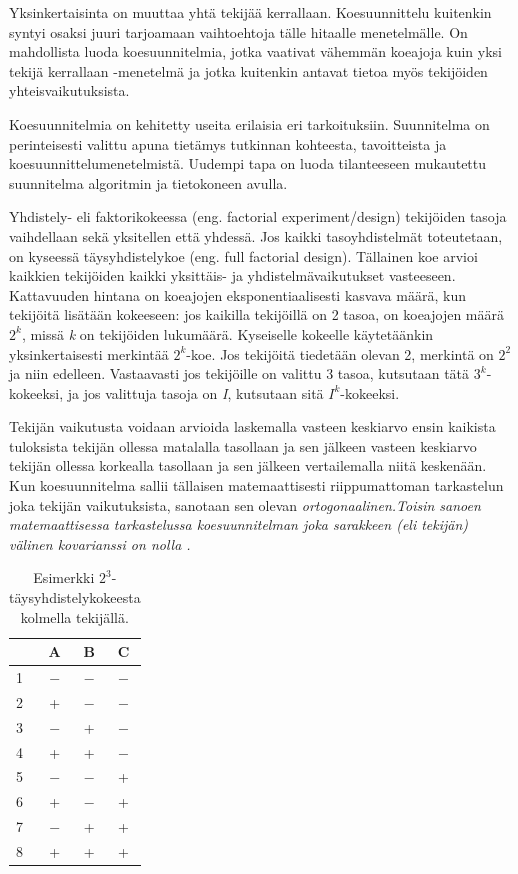 \documentclass[12pt,a4paper,finnish]{tutthesis}
\begin{document}
Yksinkertaisinta on muuttaa yhtä tekijää kerrallaan. Koesuunnittelu kuitenkin syntyi
osaksi juuri tarjoamaan vaihtoehtoja tälle hitaalle menetelmälle. On mahdollista luoda
koesuunnitelmia, jotka vaativat vähemmän koeajoja kuin yksi tekijä kerrallaan -menetelmä
ja jotka kuitenkin antavat tietoa myös tekijöiden yhteisvaikutuksista.

Koesuunnitelmia on kehitetty useita erilaisia eri tarkoituksiin.
Suunnitelma on perinteisesti valittu apuna tietämys
tutkinnan kohteesta, tavoitteista ja koesuunnittelumenetelmistä.
Uudempi tapa on luoda tilanteeseen
mukautettu suunnitelma algoritmin ja tietokoneen avulla.

Yhdistely- eli faktorikokeessa (eng. factorial experiment/design) tekijöiden
tasoja vaihdellaan sekä yksitellen että yhdessä. Jos kaikki tasoyhdistelmät
toteutetaan, on kyseessä täysyhdistelykoe (eng.
full factorial design). Tällainen koe arvioi kaikkien tekijöiden kaikki yksittäis-
ja yhdistelmävaikutukset vasteeseen. Kattavuuden hintana on koeajojen
eksponentiaalisesti kasvava määrä, kun tekijöitä lisätään kokeeseen: jos kaikilla
tekijöillä on 2 tasoa, on koeajojen määrä \(2^k\),
missä \textit{k} on
tekijöiden lukumäärä. Kyseiselle kokeelle käytetäänkin yksinkertaisesti
merkintää \(2^k\)-koe.
Jos tekijöitä tiedetään olevan 2, merkintä on
\(2^2\) ja niin edelleen. Vastaavasti jos tekijöille on valittu 3 tasoa,
kutsutaan tätä \(3^k\)-kokeeksi, ja jos valittuja tasoja on \textit{I},
kutsutaan sitä \(I^k\)-kokeeksi.

Tekijän vaikutusta voidaan arvioida laskemalla vasteen keskiarvo
ensin kaikista tuloksista tekijän ollessa matalalla tasollaan ja sen jälkeen
vasteen keskiarvo tekijän ollessa korkealla tasollaan ja sen jälkeen
vertailemalla niitä keskenään. Kun koesuunnitelma sallii tällaisen matemaattisesti
riippumattoman tarkastelun joka tekijän vaikutuksista, sanotaan
sen olevan \em ortogonaalinen.\em Toisin sanoen matemaattisessa
tarkastelussa koesuunnitelman joka sarakkeen (eli tekijän) välinen kovarianssi
on nolla \parencite{barker2005}.



\begin{table}[h]
  \begin{center}
  \caption{Esimerkki $2^3$-täysyhdistelykokeesta kolmella tekijällä.}
  \label{tab:fullf}
  \begin{tabular}{ | l | c | c | c | }
    \hline
     & \textbf{A} & \textbf{B} & \textbf{C} \\ \hline
    1 & $-$ & $-$ & $-$\\ \hline
    2 & + & $-$ & $-$\\ \hline
    3 & $-$ & + & $-$\\ \hline
    4 & + & + & $-$\\ \hline
    5 & $-$ & $-$ & +\\ \hline
    6 & + & $-$ & +\\ \hline
    7 & $-$ & + & +\\ \hline
    8 & + & + & +\\ \hline
  \end{tabular}
  \end{center}
\end{table}
\end{document}

